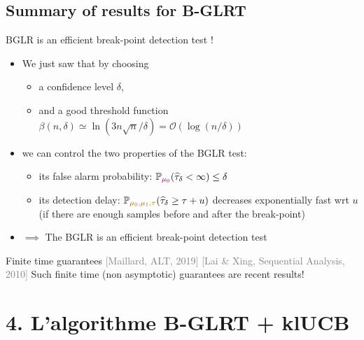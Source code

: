 \documentclass[11pt,french,ignorenonframetext,]{beamer}
\providecommand{\tightlist}{%
  \setlength{\itemsep}{0pt}\setlength{\parskip}{0pt}}
\begin{document}
\subsection{\hfill{}Summary of results for B-GLRT\hfill{}}

\begin{frame}{BGLR is an efficient break-point detection test \dCooley{} !}

  \begin{itemize}
    \item
    We just saw that by choosing
    \begin{itemize}\tightlist
      \item
      a confidence level $\delta$,
      \item
      and a good threshold function $\beta(n,\delta) \simeq \ln(3n \sqrt{n}/\delta) = \mathcal{O}(\log(n/\delta))$
    \end{itemize}
    \pause
    \item
    we can control the two properties of the BGLR test:
    \begin{itemize}\tightlist
      \item
        its \alert{false alarm probability}:
        $\mathbb{P}_{\textcolor{darkpurple}{\mu_0}}(\widehat{\tau}_\delta < \infty) \leq \delta$
      \item
        its \alert{detection delay}:
        $\mathbb{P}_{\textcolor{gold}{\mu_0,\mu_1,\tau}} (\widehat{\tau}_{\delta} \geq \tau + u)$ decreases exponentially fast wrt $u$
        (if there are enough samples before and after the break-point)
    \end{itemize}

    \item
    $\implies$ The BGLR is an efficient break-point detection test \dCooley{}
  \end{itemize}

  \pause
  \begin{block}{Finite time guarantees \dCooley{} \hfill{} \tiny{\textcolor{gray}{[Maillard, ALT, 2019]} \textcolor{gray}{[Lai \& Xing, Sequential Analysis, 2010]}}}
    Such \alert{finite time} (non asymptotic) guarantees are recent results!
  \end{block}

\end{frame}

\section{\hfill{}4. L'algorithme B-GLRT + klUCB\hfill{}}
\end{document}
